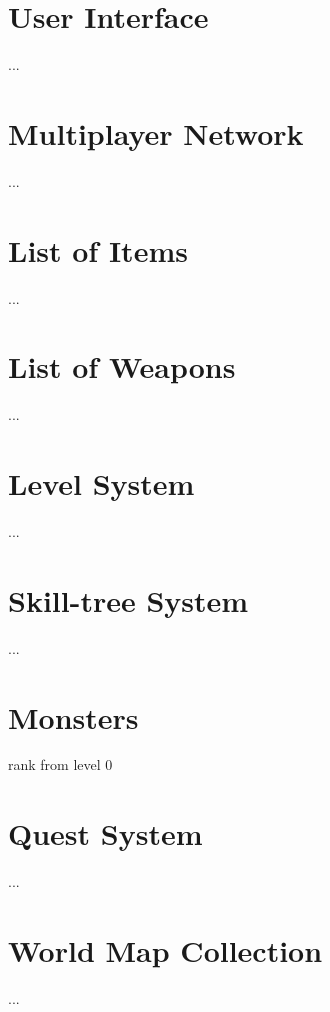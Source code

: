 \documentclass[11pt]{article}
\begin{document}
  \section{User Interface}
    ...

  \section{Multiplayer Network}
    ...

  \section{List of Items}
    ...

  \section{List of Weapons}
    ...

  \section{Level System}
    ...

  \section{Skill-tree System}
    ...

  \section{Monsters}
    rank from level 0

  \section{Quest System}
    ...

  \section{World Map Collection}
    ...
\end{document}
